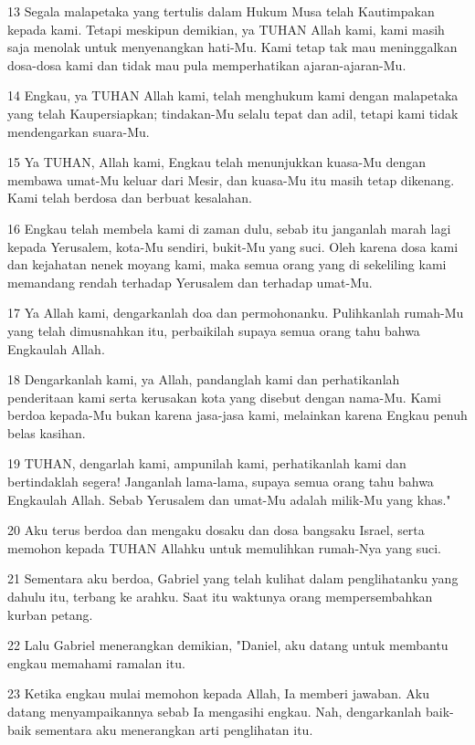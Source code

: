 \par 13 Segala malapetaka yang tertulis dalam Hukum Musa telah Kautimpakan kepada kami. Tetapi meskipun demikian, ya TUHAN Allah kami, kami masih saja menolak untuk menyenangkan hati-Mu. Kami tetap tak mau meninggalkan dosa-dosa kami dan tidak mau pula memperhatikan ajaran-ajaran-Mu.
\par 14 Engkau, ya TUHAN Allah kami, telah menghukum kami dengan malapetaka yang telah Kaupersiapkan; tindakan-Mu selalu tepat dan adil, tetapi kami tidak mendengarkan suara-Mu.
\par 15 Ya TUHAN, Allah kami, Engkau telah menunjukkan kuasa-Mu dengan membawa umat-Mu keluar dari Mesir, dan kuasa-Mu itu masih tetap dikenang. Kami telah berdosa dan berbuat kesalahan.
\par 16 Engkau telah membela kami di zaman dulu, sebab itu janganlah marah lagi kepada Yerusalem, kota-Mu sendiri, bukit-Mu yang suci. Oleh karena dosa kami dan kejahatan nenek moyang kami, maka semua orang yang di sekeliling kami memandang rendah terhadap Yerusalem dan terhadap umat-Mu.
\par 17 Ya Allah kami, dengarkanlah doa dan permohonanku. Pulihkanlah rumah-Mu yang telah dimusnahkan itu, perbaikilah supaya semua orang tahu bahwa Engkaulah Allah.
\par 18 Dengarkanlah kami, ya Allah, pandanglah kami dan perhatikanlah penderitaan kami serta kerusakan kota yang disebut dengan nama-Mu. Kami berdoa kepada-Mu bukan karena jasa-jasa kami, melainkan karena Engkau penuh belas kasihan.
\par 19 TUHAN, dengarlah kami, ampunilah kami, perhatikanlah kami dan bertindaklah segera! Janganlah lama-lama, supaya semua orang tahu bahwa Engkaulah Allah. Sebab Yerusalem dan umat-Mu adalah milik-Mu yang khas."
\par 20 Aku terus berdoa dan mengaku dosaku dan dosa bangsaku Israel, serta memohon kepada TUHAN Allahku untuk memulihkan rumah-Nya yang suci.
\par 21 Sementara aku berdoa, Gabriel yang telah kulihat dalam penglihatanku yang dahulu itu, terbang ke arahku. Saat itu waktunya orang mempersembahkan kurban petang.
\par 22 Lalu Gabriel menerangkan demikian, "Daniel, aku datang untuk membantu engkau memahami ramalan itu.
\par 23 Ketika engkau mulai memohon kepada Allah, Ia memberi jawaban. Aku datang menyampaikannya sebab Ia mengasihi engkau. Nah, dengarkanlah baik-baik sementara aku menerangkan arti penglihatan itu.

